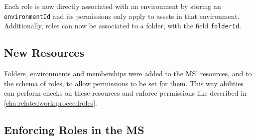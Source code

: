 Each role is now directly associated with an environment by storing an
\lstinline{environmentId} and its permissions only apply to assets in that environment.
Additionally, roles can now be associated to a folder, with the field \lstinline{folderId}.

\subsection{New Resources}

Folders, environments and memberships were added to the MS' resources, and to the schema of
roles, to allow permissions to be set for them.
This way abilities can perform checks on these resources and enforce permissions like
described in \ref{cha:relatedwork:proceedroles}.

%



\subsection{Enforcing Roles in the MS}

